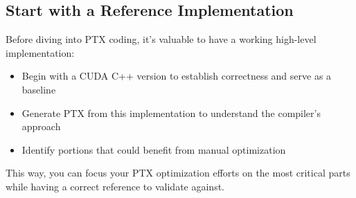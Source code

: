 \subsection{Start with a Reference Implementation}

Before diving into PTX coding, it's valuable to have a working high-level implementation:

\begin{itemize}
    \item Begin with a CUDA C++ version to establish correctness and serve as a baseline
    \item Generate PTX from this implementation to understand the compiler's approach
    \item Identify portions that could benefit from manual optimization
\end{itemize}

This way, you can focus your PTX optimization efforts on the most critical parts while having a correct reference to validate against.

